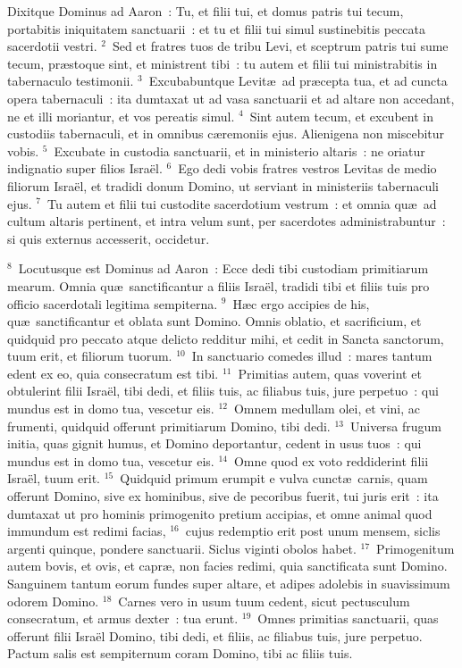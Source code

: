 \lettrine[lines=3,image=true,loversize=0.05,lraise=-0.03]{D}{}ixitque Dominus ad Aaron~: Tu, et filii tui, et domus patris tui tecum, portabitis iniquitatem sanctuarii~: et tu et filii tui simul sustinebitis peccata sacerdotii vestri.
${}^{2}$~Sed et fratres tuos de tribu Levi, et sceptrum patris tui sume tecum, pr\ae stoque sint, et ministrent tibi~: tu autem et filii tui ministrabitis in tabernaculo testimonii.
${}^{3}$~Excubabuntque Levit\ae\ ad pr\ae cepta tua, et ad cuncta opera tabernaculi~: ita dumtaxat ut ad vasa sanctuarii et ad altare non accedant, ne et illi moriantur, et vos pereatis simul.
${}^{4}$~Sint autem tecum, et excubent in custodiis tabernaculi, et in omnibus c\ae remoniis ejus. Alienigena non miscebitur vobis.
${}^{5}$~Excubate in custodia sanctuarii, et in ministerio altaris~: ne oriatur indignatio super filios Isra\"el.
${}^{6}$~Ego dedi vobis fratres vestros Levitas de medio filiorum Isra\"el, et tradidi donum Domino, ut serviant in ministeriis tabernaculi ejus.
${}^{7}$~Tu autem et filii tui custodite sacerdotium vestrum~: et omnia qu\ae\ ad cultum altaris pertinent, et intra velum sunt, per sacerdotes administrabuntur~: si quis externus accesserit, occidetur.


${}^{8}$~Locutusque est Dominus ad Aaron~: Ecce dedi tibi custodiam primitiarum mearum. Omnia qu\ae\ sanctificantur a filiis Isra\"el, tradidi tibi et filiis tuis pro officio sacerdotali legitima sempiterna.
${}^{9}$~H\ae c ergo accipies de his, qu\ae\ sanctificantur et oblata sunt Domino. Omnis oblatio, et sacrificium, et quidquid pro peccato atque delicto redditur mihi, et cedit in Sancta sanctorum, tuum erit, et filiorum tuorum.
${}^{10}$~In sanctuario comedes illud~: mares tantum edent ex eo, quia consecratum est tibi.
${}^{11}$~Primitias autem, quas voverint et obtulerint filii Isra\"el, tibi dedi, et filiis tuis, ac filiabus tuis, jure perpetuo~: qui mundus est in domo tua, vescetur eis.
${}^{12}$~Omnem medullam olei, et vini, ac frumenti, quidquid offerunt primitiarum Domino, tibi dedi.
${}^{13}$~Universa frugum initia, quas gignit humus, et Domino deportantur, cedent in usus tuos~: qui mundus est in domo tua, vescetur eis.
${}^{14}$~Omne quod ex voto reddiderint filii Isra\"el, tuum erit.
${}^{15}$~Quidquid primum erumpit e vulva cunct\ae\ carnis, quam offerunt Domino, sive ex hominibus, sive de pecoribus fuerit, tui juris erit~: ita dumtaxat ut pro hominis primogenito pretium accipias, et omne animal quod immundum est redimi facias,
${}^{16}$~cujus redemptio erit post unum mensem, siclis argenti quinque, pondere sanctuarii. Siclus viginti obolos habet.
${}^{17}$~Primogenitum autem bovis, et ovis, et capr\ae , non facies redimi, quia sanctificata sunt Domino. Sanguinem tantum eorum fundes super altare, et adipes adolebis in suavissimum odorem Domino.
${}^{18}$~Carnes vero in usum tuum cedent, sicut pectusculum consecratum, et armus dexter~: tua erunt.
${}^{19}$~Omnes primitias sanctuarii, quas offerunt filii Isra\"el Domino, tibi dedi, et filiis, ac filiabus tuis, jure perpetuo. Pactum salis est sempiternum coram Domino, tibi ac filiis tuis.


